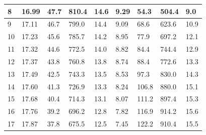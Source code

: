\documentclass[12pt, a4paper]{article}
\begin{document}
\begin{table}[H]
\begin{center}
\begin{tabular}{|l|llll|llll|}
	8  & \multicolumn{1}{l|}{16.99}  & \multicolumn{1}{l|}{47.7}    & \multicolumn{1}{l|}{810.4}   & 14.6      & \multicolumn{1}{l|}{9.29}   & \multicolumn{1}{l|}{54.3}    & \multicolumn{1}{l|}{504.4}     & 9.0       \\ \hline
	9  & \multicolumn{1}{l|}{17.11}  & \multicolumn{1}{l|}{46.7}    & \multicolumn{1}{l|}{799.0}   & 14.4      & \multicolumn{1}{l|}{9.09}   & \multicolumn{1}{l|}{68.6}    & \multicolumn{1}{l|}{623.6}     & 10.9      \\ \hline
	10 & \multicolumn{1}{l|}{17.23}  & \multicolumn{1}{l|}{45.6}    & \multicolumn{1}{l|}{785.7}   & 14.2      & \multicolumn{1}{l|}{8.95}   & \multicolumn{1}{l|}{77.9}    & \multicolumn{1}{l|}{697.2}     & 12.1      \\ \hline
	11 & \multicolumn{1}{l|}{17.32}  & \multicolumn{1}{l|}{44.6}    & \multicolumn{1}{l|}{772.5}   & 14.0      & \multicolumn{1}{l|}{8.82}   & \multicolumn{1}{l|}{84.4}    & \multicolumn{1}{l|}{744.4}     & 12.9      \\ \hline
	12 & \multicolumn{1}{l|}{17.37}  & \multicolumn{1}{l|}{43.8}    & \multicolumn{1}{l|}{760.8}   & 13.8      & \multicolumn{1}{l|}{8.74}   & \multicolumn{1}{l|}{88.4}    & \multicolumn{1}{l|}{772.6}     & 13.3      \\ \hline
	13 & \multicolumn{1}{l|}{17.49}  & \multicolumn{1}{l|}{42.5}    & \multicolumn{1}{l|}{743.3}   & 13.5      & \multicolumn{1}{l|}{8.53}   & \multicolumn{1}{l|}{97.3}    & \multicolumn{1}{l|}{830.0}     & 14.3      \\ \hline
	14 & \multicolumn{1}{l|}{17.60}  & \multicolumn{1}{l|}{41.3}    & \multicolumn{1}{l|}{726.9}   & 13.3      & \multicolumn{1}{l|}{8.24}   & \multicolumn{1}{l|}{106.8}   & \multicolumn{1}{l|}{880.0}     & 15.1      \\ \hline
	15 & \multicolumn{1}{l|}{17.68}  & \multicolumn{1}{l|}{40.4}    & \multicolumn{1}{l|}{714.3}   & 13.1      & \multicolumn{1}{l|}{8.07}   & \multicolumn{1}{l|}{111.2}   & \multicolumn{1}{l|}{897.4}     & 15.3      \\ \hline
	16 & \multicolumn{1}{l|}{17.76}  & \multicolumn{1}{l|}{39.2}    & \multicolumn{1}{l|}{696.2}   & 12.8      & \multicolumn{1}{l|}{7.82}   & \multicolumn{1}{l|}{116.9}   & \multicolumn{1}{l|}{914.2}     & 15.6      \\ \hline
	17 & \multicolumn{1}{l|}{17.87}  & \multicolumn{1}{l|}{37.8}    & \multicolumn{1}{l|}{675.5}   & 12.5      & \multicolumn{1}{l|}{7.45}   & \multicolumn{1}{l|}{122.2}   & \multicolumn{1}{l|}{910.4}     & 15.5      \\ \hline

\end{tabular}
\end{center}
\end{table}
\end{document}
